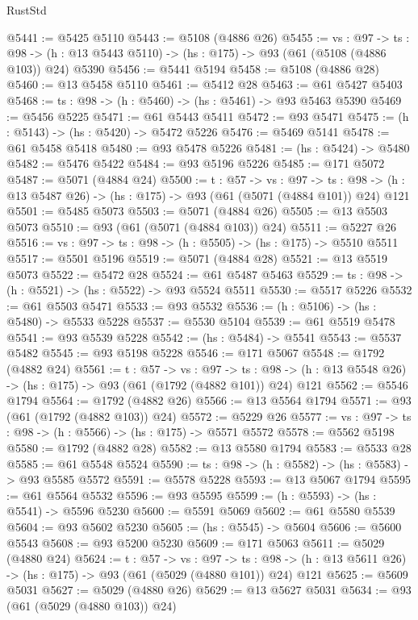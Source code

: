 \begin{lexlean}{RustStd}
\begin{coremodule}
@5441 := @5425 @5110
@5443 := @5108 (@4886 @26)
@5455 := {vs : @97} ->
  {ts : @98} -> (h : @13 @5443 @5110) -> (hs : @175) -> @93 (@61 (@5108 (@4886 @103)) @24) @5390
@5456 := @5441 @5194
@5458 := @5108 (@4886 @28)
@5460 := @13 @5458 @5110
@5461 := @5412 @28
@5463 := @61 @5427 @5403
@5468 := {ts : @98} -> (h : @5460) -> (hs : @5461) -> @93 @5463 @5390
@5469 := @5456 @5225
@5471 := @61 @5443 @5411
@5472 := @93 @5471
@5475 := (h : @5143) -> (hs : @5420) -> @5472 @5226
@5476 := @5469 @5141
@5478 := @61 @5458 @5418
@5480 := @93 @5478 @5226
@5481 := (hs : @5424) -> @5480
@5482 := @5476 @5422
@5484 := @93 @5196 @5226
@5485 := @171 @5072
@5487 := @5071 (@4884 @24)
@5500 := {t : @57} ->
  {vs : @97} ->
  {ts : @98} -> (h : @13 @5487 @26) -> (hs : @175) -> @93 (@61 (@5071 (@4884 @101)) @24) @121
@5501 := @5485 @5073
@5503 := @5071 (@4884 @26)
@5505 := @13 @5503 @5073
@5510 := @93 (@61 (@5071 (@4884 @103)) @24)
@5511 := @5227 @26
@5516 := {vs : @97} -> {ts : @98} -> (h : @5505) -> (hs : @175) -> @5510 @5511
@5517 := @5501 @5196
@5519 := @5071 (@4884 @28)
@5521 := @13 @5519 @5073
@5522 := @5472 @28
@5524 := @61 @5487 @5463
@5529 := {ts : @98} -> (h : @5521) -> (hs : @5522) -> @93 @5524 @5511
@5530 := @5517 @5226
@5532 := @61 @5503 @5471
@5533 := @93 @5532
@5536 := (h : @5106) -> (hs : @5480) -> @5533 @5228
@5537 := @5530 @5104
@5539 := @61 @5519 @5478
@5541 := @93 @5539 @5228
@5542 := (hs : @5484) -> @5541
@5543 := @5537 @5482
@5545 := @93 @5198 @5228
@5546 := @171 @5067
@5548 := @1792 (@4882 @24)
@5561 := {t : @57} ->
  {vs : @97} ->
  {ts : @98} -> (h : @13 @5548 @26) -> (hs : @175) -> @93 (@61 (@1792 (@4882 @101)) @24) @121
@5562 := @5546 @1794
@5564 := @1792 (@4882 @26)
@5566 := @13 @5564 @1794
@5571 := @93 (@61 (@1792 (@4882 @103)) @24)
@5572 := @5229 @26
@5577 := {vs : @97} -> {ts : @98} -> (h : @5566) -> (hs : @175) -> @5571 @5572
@5578 := @5562 @5198
@5580 := @1792 (@4882 @28)
@5582 := @13 @5580 @1794
@5583 := @5533 @28
@5585 := @61 @5548 @5524
@5590 := {ts : @98} -> (h : @5582) -> (hs : @5583) -> @93 @5585 @5572
@5591 := @5578 @5228
@5593 := @13 @5067 @1794
@5595 := @61 @5564 @5532
@5596 := @93 @5595
@5599 := (h : @5593) -> (hs : @5541) -> @5596 @5230
@5600 := @5591 @5069
@5602 := @61 @5580 @5539
@5604 := @93 @5602 @5230
@5605 := (hs : @5545) -> @5604
@5606 := @5600 @5543
@5608 := @93 @5200 @5230
@5609 := @171 @5063
@5611 := @5029 (@4880 @24)
@5624 := {t : @57} ->
  {vs : @97} ->
  {ts : @98} -> (h : @13 @5611 @26) -> (hs : @175) -> @93 (@61 (@5029 (@4880 @101)) @24) @121
@5625 := @5609 @5031
@5627 := @5029 (@4880 @26)
@5629 := @13 @5627 @5031
@5634 := @93 (@61 (@5029 (@4880 @103)) @24)

\end{coremodule}
\end{lexlean}
